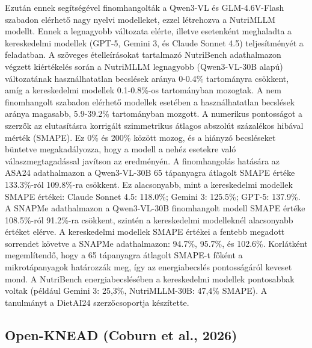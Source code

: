 Ezután ennek segítségével finomhangolták a Qwen3-VL és GLM-4.6V-Flash szabadon elérhető nagy nyelvi modelleket, ezzel létrehozva a NutriMLLM modellt. 
Ennek a legnagyobb változata elérte, illetve esetenként meghaladta a kereskedelmi modellek (GPT-5, Gemini 3, és Claude Sonnet 4.5) teljesítményét a feladatban.
A szöveges ételleírásokat tartalmazó NutriBench adathalmazon végzett kiértékelés során a NutriMLLM legnagyobb (Qwen3-VL-30B alapú) változatának használhatatlan becslések aránya 0-0.4\% tartományra csökkent, amíg a kereskedelmi modellek 0.1-0.8\%-os tartományban mozogtak. A nem finomhangolt szabadon elérhető modellek esetében a használhatatlan becslések aránya magasabb, 5.9-39.2\% tartományban mozgott.
A numerikus pontosságot a szerzők az elutasításra korrigált szimmetrikus átlagos abszolút százalékos hibával mérték (SMAPE).
Ez 0\% és 200\% között mozog, és a hiányzó becsléseket büntetve megakadályozza, hogy a modell a nehéz esetekre való válaszmegtagadással javítson az eredményén.
A finomhangolás hatására az ASA24 adathalmazon a Qwen3-VL-30B 65 tápanyagra átlagolt SMAPE értéke 133.3\%-ról 109.8\%-ra csökkent. Ez alacsonyabb, mint a kereskedelmi modellek SMAPE értékei: Claude Sonnet 4.5: 118.0\%; Gemini 3: 125.5\%; GPT-5: 137.9\%. A SNAPMe adathalmazon a Qwen3-VL-30B finomhangolt modell SMAPE értéke 108.5\%-ról 91.2\%-ra csökkent, szintén a kereskedelmi modelleknél alacsonyabb értéket elérve. A kereskedelmi modellek SMAPE értékei a fentebb megadott sorrendet követve a SNAPMe adathalmazon: 94.7\%, 95.7\%, és 102.6\%.
Korlátként megemlítendő, hogy a 65 tápanyagra átlagolt SMAPE-t főként a mikrotápanyagok határozzák meg, így az energiabecslés pontosságáról keveset mond. A NutriBench energiabecslésében a kereskedelmi modellek pontosabbak voltak (például Gemini 3: 25,3\%, NutriMLLM-30B: 47,4\% SMAPE). A tanulmányt a DietAI24 szerzőcsoportja készítette.



\subsection{Open-KNEAD (Coburn et al., 2026)}
